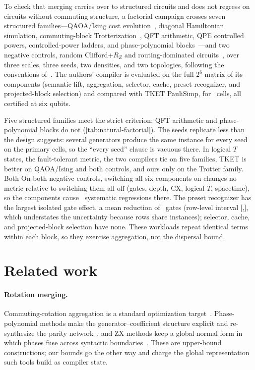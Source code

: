 \documentclass[aps,prx,reprint,superscriptaddress,floatfix,longbibliography]{revtex4-2}
\begin{document}
To check that merging carries over to structured circuits and does not
regress on circuits without commuting structure, a factorial campaign
crosses seven structured families---QAOA/Ising cost
evolution~\cite{farhi2014qaoa}, diagonal Hamiltonian simulation,
commuting-block Trotterization~\cite{childs2021trotter}, QFT arithmetic,
QPE controlled powers, controlled-power ladders, and phase-polynomial
blocks~\cite{amy2019cnot}---and two negative controls, random
Clifford+$R_Z$ and routing-dominated
circuits~\cite{cowtan2019routing,li2019sabre}, over three scales, three
seeds, two densities, and two topologies, following the conventions
of~\cite{li2023qasmbench,quetschlich2023mqt}.  The authors' compiler is
evaluated on the full $2^6$ matrix of its components (semantic lift,
aggregation, selector, cache, preset recognizer, and projected-block
selection) and compared with TKET PauliSimp, for \NaturalCells\ cells, all
certified at six qubits.

Five structured families meet the strict criterion; QFT arithmetic and
phase-polynomial blocks do not (\cref{tab:natural-factorial}).  The seeds
replicate less than the design suggests: several generators produce the
same instance for every seed on the primary cells, so the ``every seed''
clause is vacuous there.  In logical $T$ states, the fault-tolerant
metric, the two compilers tie on five families, TKET is better on
QAOA/Ising and both controls, and ours only on the Trotter family.  Both
On both negative controls, switching all six components on changes no
metric relative to switching them all off (gates, depth, CX, logical $T$,
spacetime), so the components cause \NaturalNegativeRegressions\
systematic regressions there.  The preset recognizer has the largest
isolated gate effect, a mean reduction of \PresetGateEffect\ gates
(row-level interval [\PresetGateEffectLow,\PresetGateEffectHigh], which
understates the uncertainty because rows share instances); selector,
cache, and projected-block selection have none.
These workloads repeat identical terms within each block, so they exercise
aggregation, not the dispersal bound.

\section{Related work}
\label{sec:related-work}

\paragraph*{Rotation merging.}
Commuting-rotation aggregation is a standard optimization
target~\cite{amy2014tdepth,nam2018automated,cowtan2020phase,sivarajah2021tket,duncan2020graph,kissinger2020reducing,kissinger2020pyzx}.
Phase-polynomial methods make the generator--coefficient structure
explicit and re-synthesize the parity
network~\cite{amy2019cnot,beaudrap2020techniques,meijer2023architecture},
and ZX methods keep a global normal form in which phases fuse across
syntactic boundaries~\cite{vandewetering2020zx,kissinger2022simulating}.
These are upper-bound constructions; our bounds go the other way and charge
the global representation such tools build as compiler state.
\end{document}
